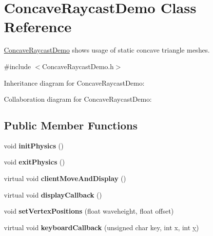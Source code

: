 \hypertarget{class_concave_raycast_demo}{\section{Concave\+Raycast\+Demo Class Reference}
\label{class_concave_raycast_demo}
}


\hyperlink{class_concave_raycast_demo}{Concave\+Raycast\+Demo} shows usage of static concave triangle meshes.  




{\ttfamily \#include $<$Concave\+Raycast\+Demo.\+h$>$}



Inheritance diagram for Concave\+Raycast\+Demo\+:


Collaboration diagram for Concave\+Raycast\+Demo\+:
\subsection*{Public Member Functions}
\begin{DoxyCompactItemize}
\item 
\hypertarget{class_concave_raycast_demo_a464b990db295146a0006f9a15d8e9deb}{void {\bfseries init\+Physics} ()}\label{class_concave_raycast_demo_a464b990db295146a0006f9a15d8e9deb}

\item 
\hypertarget{class_concave_raycast_demo_abbbd5d8aef6a62e0bb8e3ace795e3cdb}{void {\bfseries exit\+Physics} ()}\label{class_concave_raycast_demo_abbbd5d8aef6a62e0bb8e3ace795e3cdb}

\item 
\hypertarget{class_concave_raycast_demo_ab9e2ba1df2619fb65cb04c21017441d6}{virtual void {\bfseries client\+Move\+And\+Display} ()}\label{class_concave_raycast_demo_ab9e2ba1df2619fb65cb04c21017441d6}

\item 
\hypertarget{class_concave_raycast_demo_aa05afc3eedcd4c03f38f8349ecc31a96}{virtual void {\bfseries display\+Callback} ()}\label{class_concave_raycast_demo_aa05afc3eedcd4c03f38f8349ecc31a96}

\item 
\hypertarget{class_concave_raycast_demo_a888658264f56c294b102e58543e691bf}{void {\bfseries set\+Vertex\+Positions} (float waveheight, float offset)}\label{class_concave_raycast_demo_a888658264f56c294b102e58543e691bf}

\item 
\hypertarget{class_concave_raycast_demo_a0d5fb6044a6a4c788e8bc0a39483227d}{virtual void {\bfseries keyboard\+Callback} (unsigned char key, int x, int \hyperlink{_ice_utils_8h_aa7ffaed69623192258fb8679569ff9ba}{y})}\label{class_concave_raycast_demo_a0d5fb6044a6a4c788e8bc0a39483227d}

\end{DoxyCompactItemize}

